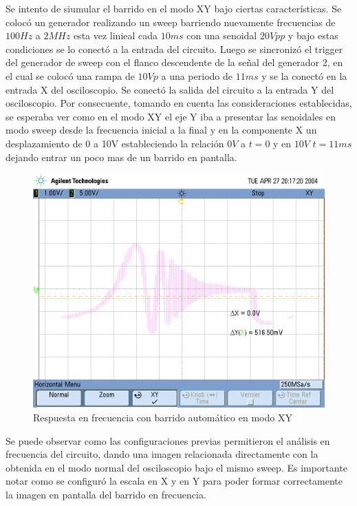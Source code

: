 Se intento de siumular el barrido en el modo XY bajo ciertas características.
Se colocó un generador realizando un sweep barriendo nuevamente frecuencias
de $100Hz$ a $2MHz$ esta vez linieal cada $10ms$ con una senoidal
$20Vpp$ y bajo estas condiciones se lo conectó a la entrada del circuito.
Luego se sincronizó el trigger del generador de sweep con el flanco
descendente de la señal del generador 2, en el cual se colocó una
rampa de $10Vp$ a una periodo de $11ms$ y se la conectó en la entrada
X del osciloscopio. Se conectó la salida del circuito a la entrada
Y del osciloscopio. Por consecuente, tomando en cuenta las consideraciones
establecidas, se esperaba ver como en el modo XY el eje Y iba a presentar
las senoidales en modo sweep desde la frecuencia inicial a la final
y en la componente X un desplazamiento de 0 a 10V estableciendo la
relación $0V$ a $t=\text{0}$ y en $10V$ $t=11ms$ dejando entrar
un poco mas de un barrido en pantalla.
\begin{figure}[H]
\centering{}\includegraphics{./scope_24.png}\caption{Respuesta en frecuencia con barrido automático en modo XY}
\end{figure}

Se puede observar como las configuraciones previas permitieron el
análisis en frecuencia del circuito, dando una imagen relacionada
directamente con la obtenida en el modo normal del osciloscopio bajo
el mismo sweep. Es importante notar como se configuró la escala en
X y en Y para poder formar correctamente la imagen en pantalla del
barrido en frecuencia.

